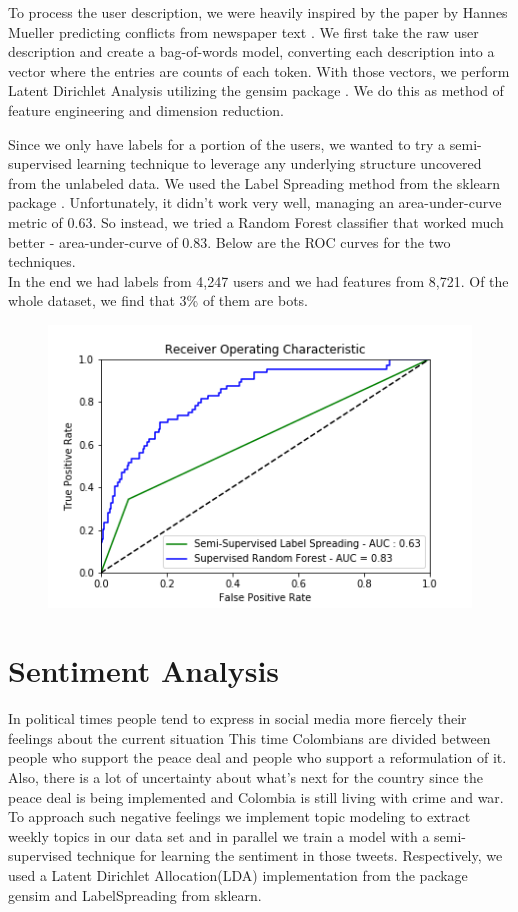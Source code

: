\documentclass[10pt,a4paper]{article} %
\begin{document}
		To process the user description, we were heavily inspired by the paper by Hannes Mueller predicting conflicts from newspaper text \cite{mueller_rauh_2018}.  We first take the raw user description and create a bag-of-words model, converting each description into a vector where the entries are counts of each token.  With those vectors, we perform Latent Dirichlet Analysis utilizing the gensim package \cite{rehurek_lrec}.  We do this as method of feature engineering and dimension reduction.
		
		Since we only have labels for a portion of the users, we wanted to try a semi-supervised learning technique to leverage any underlying structure uncovered from the unlabeled data.  We used the Label Spreading method from the sklearn package \cite{scikit-learn}.  Unfortunately, it didn't work very well, managing an area-under-curve metric of 0.63.  So instead, we tried a Random Forest classifier that worked much better - area-under-curve of 0.83.  Below are the ROC curves for the two techniques.  \\
		In the end we had labels from 4,247 users and we had features from 8,721.  Of the whole dataset, we find that 3\% of them are bots. \\
		\begin{figure}[!hb]
			\includegraphics[width=0.75\linewidth]{roc_curve}
			\centering
			\setlength{\belowcaptionskip}{-10pt}
		\end{figure}
	
	
		
	\section{Sentiment Analysis}
In political times people tend to express in social media more fiercely their feelings about the current situation  This time Colombians are divided between people who support the peace deal and people who support a reformulation of it. Also, there is a lot of uncertainty about what's next for the country since the peace deal is being implemented and Colombia is still living with crime and war. To approach such negative feelings we implement topic modeling to extract weekly topics in our data set and in parallel we train a model with a semi-supervised technique for learning the sentiment in those tweets. Respectively, we used a Latent Dirichlet Allocation(LDA) implementation from the package gensim and LabelSpreading from sklearn.
\end{document}
